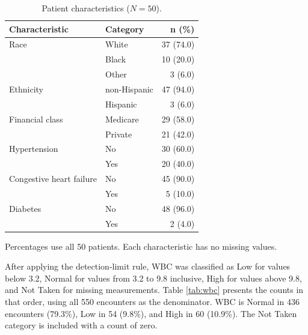 \documentclass[11pt,letterpaper]{article}
\begin{document}
\begin{table}[!htbp]
\centering
\caption{Patient characteristics ($N = 50$).}\label{tab:patients}

\begin{tabular}{llr}
\toprule
Characteristic & Category & n (\%)\\
\midrule
Race & White & 37 (74.0)\\
 & Black & 10 (20.0)\\
 & Other & 3 (6.0)\\
Ethnicity & non-Hispanic & 47 (94.0)\\
 & Hispanic & 3 (6.0)\\
Financial class & Medicare & 29 (58.0)\\
 & Private & 21 (42.0)\\
Hypertension & No & 30 (60.0)\\
 & Yes & 20 (40.0)\\
Congestive heart failure & No & 45 (90.0)\\
 & Yes & 5 (10.0)\\
Diabetes & No & 48 (96.0)\\
 & Yes & 2 (4.0)\\
\bottomrule
\end{tabular}

\par\vspace{5pt}\begin{minipage}{0.90\textwidth}\small
Percentages use all 50 patients. Each characteristic has no missing values.
\end{minipage}
\end{table}

After applying the detection-limit rule, WBC was classified as Low for
values below 3.2, Normal for values from 3.2 to 9.8 inclusive, High for
values above 9.8, and Not Taken for missing measurements. Table
\ref{tab:wbc} presents the counts in that order, using all 550
encounters as the denominator. WBC is Normal in 436 encounters (79.3\%),
Low in 54 (9.8\%), and High in 60 (10.9\%). The Not Taken category is
included with a count of zero.
\end{document}
